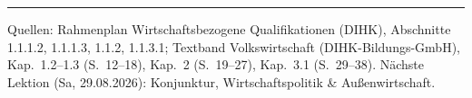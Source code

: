 \documentclass[11pt, a4paper]{article}
\begin{document}
\vspace{1em}
\hrule
\vspace{0.8em}
\noindent\textsf{\small Quellen: Rahmenplan Wirtschaftsbezogene Qualifikationen (DIHK), Abschnitte 1.1.1.2, 1.1.1.3, 1.1.2, 1.1.3.1;
Textband Volkswirtschaft (DIHK-Bildungs-GmbH), Kap.~1.2--1.3 (S.~12--18), Kap.~2 (S.~19--27), Kap.~3.1 (S.~29--38).
Nächste Lektion (Sa, 29.08.2026): Konjunktur, Wirtschaftspolitik \& Außenwirtschaft.}
\end{document}
